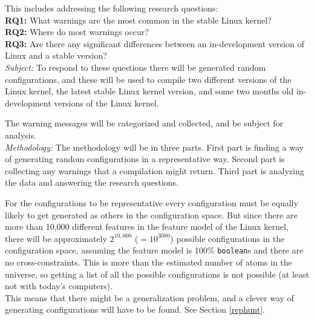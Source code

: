\documentclass[a4paper,11pt]{report}
\begin{document}
This includes addressing the following research questions:
\\

\textbf{RQ1:} What warnings are the most common in the stable Linux kernel?
\\

\textbf{RQ2:} Where do most warnings occur?
\\

\textbf{RQ3:} Are there any significant differences between an in-development 
version of Linux and a stable version?
\\

\emph{Subject:}
To respond to these questions there will be generated random configurations, 
and these will be used to compile two different versions of the Linux kernel, 
the latest stable Linux kernel version, and some two months old in-development 
versions of the Linux kernel.

The warning messages will be categorized and collected, and be subject for 
analysis.
\\

\emph{Methodology:}
The methodology will be in three parts. First part is finding a way of
generating random configurations in a representative way. Second part is 
collecting any warnings that a compilation might return. Third part is 
analyzing the data and answering the research questions.
\\

        \def \fn{Not counting cross-tree contraints, but also saying 
        everything is a \texttt{boolean} and not \texttt{tristate}, or 
        \texttt{string}.}

For the configurations to be representative every configuration must be equally 
likely to get generated as others in the configuration space. But since there are more than 
10,000 different features in the feature model of the Linux kernel, there will 
be approximately $2^{10,000}$ ($=10^{3080}$) possible configurations in the 
configuration space, assuming the feature model is 100\% \texttt{boolean}s and 
there are no cross-constraints.  This is more than the estimated number of 
atoms in the universe, so getting a list of all the possible configurations is 
not possible (at least not with today's computers).
\\

This means that there might be a generalization problem, and a clever way of 
generating configurations will have to be found. See Section \ref{rephunt}.
\end{document}
